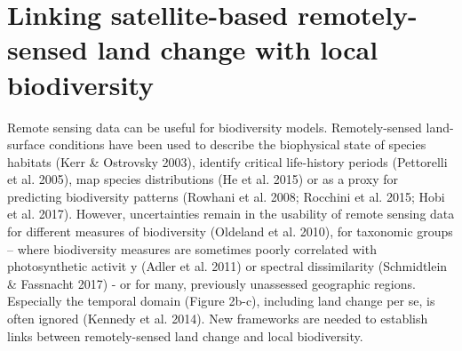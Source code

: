

\section{Linking satellite-based remotely-sensed land change with local biodiversity }

Remote sensing data can be useful for biodiversity models. Remotely-sensed land-surface conditions   have been used to describe the biophysical state of species habitats (Kerr & Ostrovsky 2003), identify critical life-history periods (Pettorelli et al. 2005), map species distributions (He et al. 2015) or as a proxy for predicting biodiversity patterns (Rowhani et al. 2008; Rocchini et al. 2015; Hobi et al. 2017). However, uncertainties remain in the usability of remote sensing data for different measures of biodiversity (Oldeland et al. 2010), for taxonomic groups – where biodiversity measures are sometimes poorly correlated with photosynthetic activit  y (Adler et al. 2011) or spectral dissimilarity (Schmidtlein & Fassnacht 2017) - or for many, previously unassessed geographic regions. Especially the temporal domain (Figure 2b-c), including land change per se, is often ignored (Kennedy et al. 2014). New frameworks are needed to establish links between remotely-sensed land change and local biodiversity.

\clearpage
%

%  
